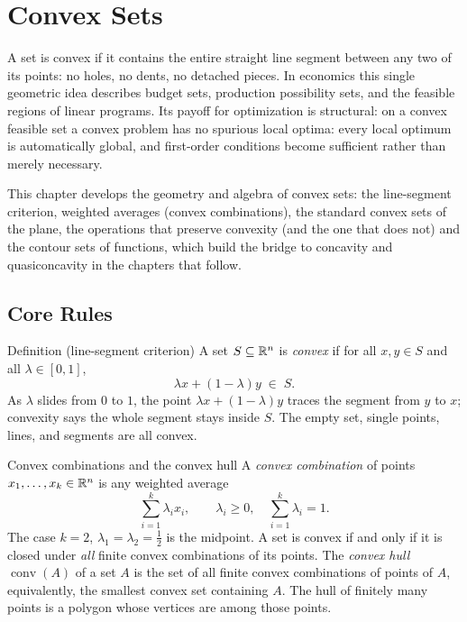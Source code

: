\chapter{Convex Sets}

A set is convex if it contains the entire straight line
segment between any two of its points: no holes, no dents, no detached
pieces. In economics this single geometric idea describes budget sets,
production possibility sets, and the feasible regions of linear programs.
Its payoff for optimization is structural: on a convex feasible set a convex
problem has no spurious local optima: every local optimum is automatically
global, and first-order conditions become sufficient rather than merely
necessary.

This chapter develops the geometry and algebra of convex sets: the
line-segment criterion, weighted averages (convex combinations), the standard
convex sets of the plane, the operations that preserve convexity (and the
one that does not) and the contour sets of functions, which build
the bridge to concavity and quasiconcavity in the chapters that follow.

\section{Core Rules}

\begin{rulebox}{Definition (line-segment criterion)}
A set $S\subseteq\mathbb{R}^{n}$ is \emph{convex} if for all $x,y\in S$ and all
$\lambda\in[0,1]$,
\[
  \lambda x+(1-\lambda)y \;\in\; S .
\]
As $\lambda$ slides from $0$ to $1$, the point $\lambda x+(1-\lambda)y$
traces the segment from $y$ to $x$; convexity says the whole segment stays
inside $S$. The empty set, single points, lines, and segments are all convex.
\end{rulebox}

\begin{rulebox}{Convex combinations and the convex hull}
A \emph{convex combination} of points
$x_{1},\dots,x_{k}\in\mathbb{R}^{n}$ is any weighted average
\[
  \sum_{i=1}^{k}\lambda_{i}x_{i},
  \qquad \lambda_{i}\ge 0,\quad \sum_{i=1}^{k}\lambda_{i}=1 .
\]
The case $k=2$, $\lambda_{1}=\lambda_{2}=\tfrac12$ is the midpoint. A set is
convex if and only if it is closed under \emph{all} finite convex
combinations of its points. The \emph{convex hull}
$\operatorname{conv}(A)$ of a set $A$ is the set of all finite convex
combinations of points of $A$, equivalently, the smallest convex set
containing $A$. The hull of finitely many points is a polygon whose vertices
are among those points.
\end{rulebox}

